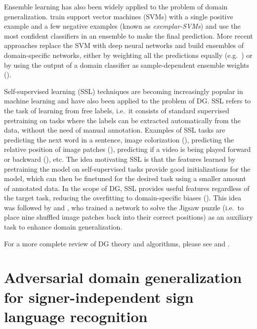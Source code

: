 Ensemble learning has also been widely applied to the problem of domain generalization. \citet{Zheng2014} train support vector machines (SVMs) with a single positive example and a few negative examples (known as \emph{exemplar-SVMs}) and use the most confident classifiers in an ensemble to make the final prediction. More recent approaches replace the SVM with deep neural networks and build ensembles of domain-specific networks, either by weighting all the predictions equally (e.g.\ \citet{Innocente2018, Zhou2020}) or by using the output of a domain classifier as sample-dependent ensemble weights (\citet{Wang2020a}).

Self-supervised learning (SSL) techniques are becoming increasingly popular in machine learning and have also been applied to the problem of DG. SSL refers to the task of learning from free labels, i.e.\ it consists of standard supervised pretraining on tasks where the labels can be extracted automatically from the data, without the need of manual annotation. Examples of SSL tasks are predicting the next word in a sentence, image colorization (\citet{Zhang2016}), predicting the relative position of image patches (\citet{Doersch2015}), predicting if a video is being played forward or backward (\citet{Wei2018}), etc. The idea motivating SSL is that the features learned by pretraining the model on self-supervised tasks provide good initializations for the model, which can then be finetuned for the desired task using a smaller amount of annotated data. In the scope of DG, SSL provides useful features regardless of the target task, reducing the overfitting to domain-specific biases (\citet{Zhou2021}). This idea was followed by \citet{Carlucci2019} and \citet{Wang2020b}, who trained a network to solve the Jigsaw puzzle (i.e.\ to place nine shuffled image patches back into their correct positions) as an auxiliary task to enhance domain generalization.

For a more complete review of DG theory and algorithms, please see \citet{Wang2021} and \citet{Zhou2021}.

\section{Adversarial domain generalization for signer-independent sign language recognition}
\label{sec:adv_signer_inv}

